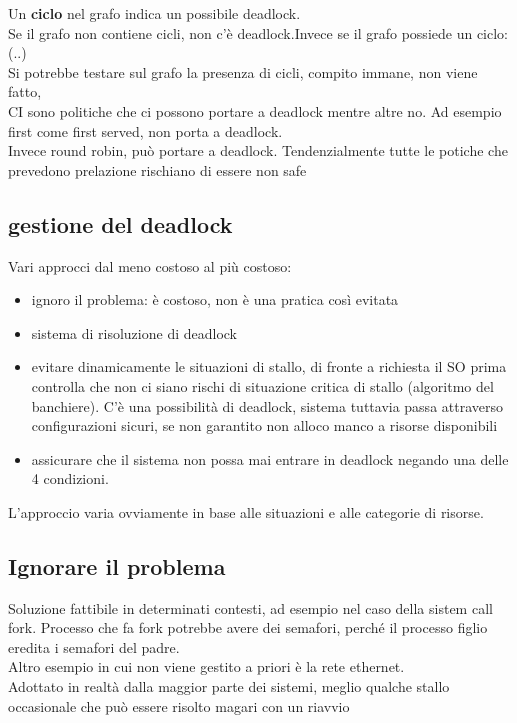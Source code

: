 \documentclass{article}
\begin{document}
Un \textbf{ciclo} nel grafo indica un possibile deadlock.\\
Se il grafo non contiene cicli, non c'è deadlock.Invece se il grafo possiede un ciclo: \\
(..)\\
Si potrebbe testare sul grafo la presenza di cicli, compito immane, non viene fatto,\\
CI sono politiche che ci possono portare a deadlock mentre altre no. Ad esempio first come first served, non porta a deadlock.\\
Invece round robin, può portare a deadlock. Tendenzialmente tutte le potiche che prevedono prelazione rischiano di essere non safe\\

\subsection{gestione del deadlock}
Vari approcci dal meno costoso al più costoso:
\begin{itemize}
\item ignoro il problema: è costoso, non è una pratica così evitata
\item sistema di risoluzione di deadlock
\item evitare dinamicamente le situazioni di stallo, di fronte a richiesta il SO prima controlla che non ci siano rischi di situazione critica di stallo 
(algoritmo del banchiere). C'è una possibilità di deadlock, sistema tuttavia passa attraverso configurazioni sicuri, se non garantito non alloco manco a risorse disponibili
\item assicurare che il sistema non possa mai entrare in deadlock negando una delle 4 condizioni.
\end{itemize}
L'approccio varia ovviamente in base alle situazioni e alle categorie di risorse.\\

\subsection{Ignorare il problema}
Soluzione fattibile in determinati contesti, ad esempio nel caso della sistem call fork. Processo che fa fork potrebbe avere dei semafori, perché il processo figlio eredita i semafori del padre.\\
Altro esempio in cui non viene gestito a priori è la rete ethernet. \\
Adottato in realtà dalla maggior parte dei sistemi, meglio qualche stallo occasionale che può essere risolto magari con un riavvio
\end{document}

